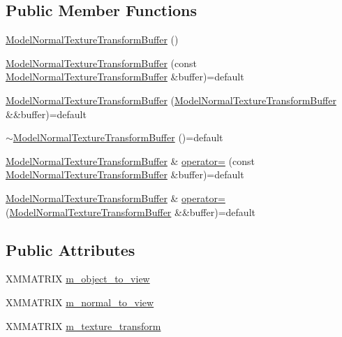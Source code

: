 \subsection*{Public Member Functions}
\begin{DoxyCompactItemize}
\item 
\hyperlink{structmage_1_1_model_normal_texture_transform_buffer_ad419df3f0977a4d9185489c19e2237b6}{Model\+Normal\+Texture\+Transform\+Buffer} ()
\item 
\hyperlink{structmage_1_1_model_normal_texture_transform_buffer_abf62d5e6d36c5a012907933d9f5cdcd8}{Model\+Normal\+Texture\+Transform\+Buffer} (const \hyperlink{structmage_1_1_model_normal_texture_transform_buffer}{Model\+Normal\+Texture\+Transform\+Buffer} \&buffer)=default
\item 
\hyperlink{structmage_1_1_model_normal_texture_transform_buffer_a8d35262220485ab7657991f93553a52c}{Model\+Normal\+Texture\+Transform\+Buffer} (\hyperlink{structmage_1_1_model_normal_texture_transform_buffer}{Model\+Normal\+Texture\+Transform\+Buffer} \&\&buffer)=default
\item 
\hyperlink{structmage_1_1_model_normal_texture_transform_buffer_a5b37f45ead4f5b40e2d9de8ef116a057}{$\sim$\+Model\+Normal\+Texture\+Transform\+Buffer} ()=default
\item 
\hyperlink{structmage_1_1_model_normal_texture_transform_buffer}{Model\+Normal\+Texture\+Transform\+Buffer} \& \hyperlink{structmage_1_1_model_normal_texture_transform_buffer_a5ce1f572ceecdb53b66d6f3f8f03e5f8}{operator=} (const \hyperlink{structmage_1_1_model_normal_texture_transform_buffer}{Model\+Normal\+Texture\+Transform\+Buffer} \&buffer)=default
\item 
\hyperlink{structmage_1_1_model_normal_texture_transform_buffer}{Model\+Normal\+Texture\+Transform\+Buffer} \& \hyperlink{structmage_1_1_model_normal_texture_transform_buffer_aa5c10733681849e37988a9d1bf75a637}{operator=} (\hyperlink{structmage_1_1_model_normal_texture_transform_buffer}{Model\+Normal\+Texture\+Transform\+Buffer} \&\&buffer)=default
\end{DoxyCompactItemize}
\subsection*{Public Attributes}
\begin{DoxyCompactItemize}
\item 
X\+M\+M\+A\+T\+R\+IX \hyperlink{structmage_1_1_model_normal_texture_transform_buffer_ad7529c313b070994419a129476db4308}{m\+\_\+object\+\_\+to\+\_\+view}
\item 
X\+M\+M\+A\+T\+R\+IX \hyperlink{structmage_1_1_model_normal_texture_transform_buffer_a2e8950b98f36bd1ad6d5b35a8db298a9}{m\+\_\+normal\+\_\+to\+\_\+view}
\item 
X\+M\+M\+A\+T\+R\+IX \hyperlink{structmage_1_1_model_normal_texture_transform_buffer_a702a55ad742e74f29c57582dd2686864}{m\+\_\+texture\+\_\+transform}
\end{DoxyCompactItemize}
